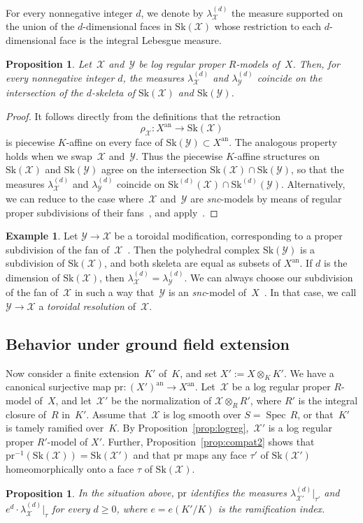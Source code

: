 \documentclass[JEP,XML,SOM,Unicode,NoFloatCountersInSection]{cedram}
\newtheorem{prop}[equation]{Proposition}
\theoremstyle{definition}
\newtheorem{example}[equation]{Example}
\numberwithin{equation}{subsection}
\newcommand{\cX}{\ensuremath{\mathscr{X}}}
\newcommand{\cY}{\ensuremath{\mathscr{Y}}}
\newcommand{\snc}{\textit{snc}}
\newcommand{\an}{\mathrm{an}}
\newcommand{\pr}{\mathrm{pr}}
\newcommand{\Sk}{\mathrm{Sk}}
\DeclareMathOperator{\Spec}{Spec}
\let\Leb\lambda
\begin{document}
For every nonnegative integer $d$, we denote by $\Leb^{(d)}_{\cX}$ the measure supported on the union of the $d$-dimensional faces in $\Sk(\cX)$ whose restriction
to each $d$-dimensional face is the integral Lebesgue measure.

\begin{prop}\label{prop:compat3}
Let~$\cX$ and~$\cY$ be log regular proper $R$\nobreakdash-models of~$X$.
Then, for every nonnegative integer $d$, the measures $\Leb^{(d)}_{\cX}$ and $\Leb^{(d)}_{\cY}$ coincide on the intersection of the $d$\nobreakdash-skeleta of $\Sk(\cX)$ and $\Sk(\cY)$.
\end{prop}

\begin{proof}
It follows directly from the definitions that the retraction
\[
\rho_{\cX}\colon X^{\an}\to \Sk(\cX)
\]
is piecewise $K$\nobreakdash-affine
on every face of $\Sk(\cY)\subset X^{\an}$. The analogous property holds when we swap~$\cX$ and~$\cY$. Thus the piecewise $K$\nobreakdash-affine structures on $\Sk(\cX)$ and $\Sk(\cY)$ agree on the intersection $\Sk(\cX)\cap \Sk(\cY)$, so that the measures $\Leb_{\cX}^{(d)}$ and $\Leb_{\cY}^{(d)}$ coincide on $\Sk^{(d)}(\cX)\cap \Sk^{(d)}(\cY)$. Alternatively, we can reduce to the case where~$\cX$ and~$\cY$ are \snc-models by means of regular proper subdivisions of their fans~\cite[10.4]{kato}, and apply~\cite[3.2.4]{MuNi}.
\end{proof}
\begin{example}\label{exam:torres}
Let $\cY\to \cX$ be a toroidal modification, corresponding to a proper subdivision of the fan of~$\cX$~\cite[\S9]{kato}.
Then the polyhedral complex $\Sk(\cY)$ is a subdivision of $\Sk(\cX)$, and both skeleta are equal as subsets of $X^{\an}$.
If $d$ is the dimension of $\Sk(\cX)$, then $\Leb^{(d)}_{\cX}=\Leb^{(d)}_{\cY}$. We can always choose our subdivision of the fan of~$\cX$ in such a way that~$\cY$ is an \snc-model of~$X$~\cite[10.4]{kato}. In that case, we call $\cY\to \cX$ a {\em toroidal resolution} of~$\cX$.
\end{example}
\subsection{Behavior under ground field extension}
Now consider a finite extension~$K'$ of~$K$, and set $X':=X\otimes_KK'$.
We have a canonical surjective map $\pr\colon (X')^{\an}\to X^{\an}$.
Let~$\cX$ be a log regular proper $R$\nobreakdash-model of~$X$, and let~$\cX'$ be the normalization of $\cX\otimes_R R'$, where $R'$ is the integral closure of~$R$ in~$K'$.
Assume that~$\cX$ is log smooth over $S=\Spec\,R$, or that~$K'$ is tamely ramified over~$K$.
By Proposition~\ref{prop:logreg},~$\cX'$ is a log regular proper $R'$-model of $X'$. Further, Proposition~\ref{prop:compat2} shows that $\pr^{-1}(\Sk(\cX))=\Sk(\cX')$
and that $\pr$ maps any face $\tau'$ of $\Sk(\cX')$ homeomorphically onto a face $\tau$ of $\Sk(\cX)$.
\begin{prop}\label{prop:compat4}
In the situation above, $\pr$ identifies the measures $\Leb^{(d)}_{\cX'}|_{\tau'}$
and $e^d\cdot \Leb^{(d)}_{\cX}|_{\tau}$ for every $d\geq 0$,
where $e=e(K'/K)$ is the ramification index.
\end{prop}
\end{document}
